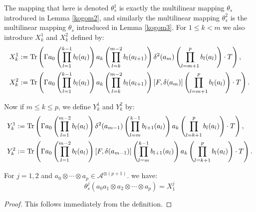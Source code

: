     The mapping that here is denoted $\theta_s^1$ is exactly the multilinear mapping $\theta_s$ introduced in Lemma \ref{kogom2}, and similarly
    the multilinear mapping $\theta_s^2$ is the multilinear mapping $\theta_s$ introduced in Lemma \ref{kogom3}. For $1\leq k < m$ we also introduce $X_k^1$ and $X_k^2$ defined by:
    \begin{align*}
        X_k^1 &:= {\rm Tr}\left(\Gamma a_0\left(\prod_{l=1}^{k-1}b_l(a_l)\right)a_k\left(\prod_{l=k}^{m-2}b_l(a_{l+1})\right)\delta^2(a_m)\left(\prod_{l=m+1}^pb_l(a_l)\right)\cdot T\right),\\
        X_k^2 &:= {\rm Tr}\left(\Gamma a_0\left(\prod_{l=1}^{k-1}b_l(a_l)\right)a_k\left(\prod_{l=k}^{m-2}b_l(a_{l+1})\right) [F,\delta(a_m)]\left(\prod_{l=m+1}^pb_l(a_l)\right)\cdot T\right).
    \end{align*}
    
    Now if $m\leq k \leq p$, we define $Y^1_k$ and $Y^2_k$ by:
    \begin{align*}
          Y_k^1 &:= {\rm Tr}\left(\Gamma a_0\left(\prod_{l=1}^{m-2}b_l(a_l)\right)\delta^2(a_{m-1})\left(\prod_{l=m}^{k-1}b_{l+1}(a_l)\right) a_k\left(\prod_{l=k+1}^pb_l(a_l)\right)\cdot T\right),\\
          Y_k^2 &:= {\rm Tr}\left(\Gamma a_0\left(\prod_{l=1}^{m-2}b_l(a_l)\right)[F,\delta(a_{m-1})]\left(\prod_{l=m}^{k-1}b_{l+1}(a_l)\right)a_k\left(\prod_{l=k+1}^pb_l(a_l)\right)\cdot T\right).
    \end{align*}

    \begin{lem}\label{kogom app 1}
        For $j = 1,2$ and $a_0\otimes\cdots\otimes a_p\in \mathcal{A}^{\otimes (p+1)}$. we have:
        \begin{equation*}
            \theta^j_s(a_0a_1\otimes a_2\otimes\cdots\otimes a_p) = X_1^j
        \end{equation*}
    \end{lem}
    \begin{proof}
        This follows immediately from the definition.
    \end{proof}


